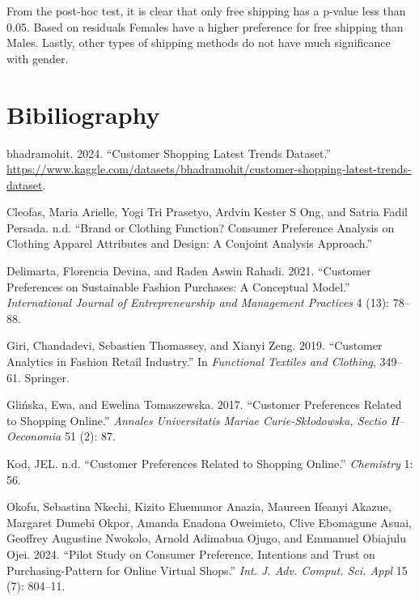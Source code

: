 \documentclass[
  letterpaper,
  DIV=11,
  numbers=noendperiod]{scrartcl}
\newlength{\cslhangindent}
\newenvironment{CSLReferences}[2] %
 {\begin{list}{}{%
  \setlength{\itemindent}{0pt}
  \setlength{\leftmargin}{0pt}
  \setlength{\parsep}{0pt}
  \ifodd #1
   \setlength{\leftmargin}{\cslhangindent}
   \setlength{\itemindent}{-1\cslhangindent}
  \fi
  \setlength{\itemsep}{#2\baselineskip}}}
 {\end{list}}
\begin{document}
From the post-hoc test, it is clear that only free shipping has a
p-value less than 0.05. Based on residuals Females have a higher
preference for free shipping than Males. Lastly, other types of shipping
methods do not have much significance with gender.

\newpage

\section{Bibiliography}\label{bibiliography}

\label{refs}
\begin{CSLReferences}{1}{0}
bhadramohit. 2024. {``Customer Shopping Latest Trends Dataset.''}
\url{https://www.kaggle.com/datasets/bhadramohit/customer-shopping-latest-trends-dataset}.

Cleofas, Maria Arielle, Yogi Tri Prasetyo, Ardvin Kester S Ong, and
Satria Fadil Persada. n.d. {``Brand or Clothing Function? Consumer
Preference Analysis on Clothing Apparel Attributes and Design: A
Conjoint Analysis Approach.''}

Delimarta, Florencia Devina, and Raden Aswin Rahadi. 2021. {``Customer
Preferences on Sustainable Fashion Purchases: A Conceptual Model.''}
\emph{International Journal of Entrepreneurship and Management
Practices} 4 (13): 78--88.

Giri, Chandadevi, Sebastien Thomassey, and Xianyi Zeng. 2019.
{``Customer Analytics in Fashion Retail Industry.''} In \emph{Functional
Textiles and Clothing}, 349--61. Springer.

Glińska, Ewa, and Ewelina Tomaszewska. 2017. {``Customer Preferences
Related to Shopping Online.''} \emph{Annales Universitatis Mariae
Curie-Sk{ł}odowska, Sectio H--Oeconomia} 51 (2): 87.

Kod, JEL. n.d. {``Customer Preferences Related to Shopping Online.''}
\emph{Chemistry} 1: 56.

Okofu, Sebastina Nkechi, Kizito Eluemunor Anazia, Maureen Ifeanyi
Akazue, Margaret Dumebi Okpor, Amanda Enadona Oweimieto, Clive Ebomagune
Asuai, Geoffrey Augustine Nwokolo, Arnold Adimabua Ojugo, and Emmanuel
Obiajulu Ojei. 2024. {``Pilot Study on Consumer Preference, Intentions
and Trust on Purchasing-Pattern for Online Virtual Shops.''} \emph{Int.
J. Adv. Comput. Sci. Appl} 15 (7): 804--11.


\end{CSLReferences}
\end{document}
